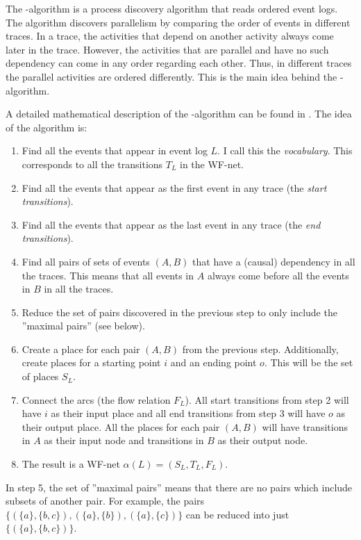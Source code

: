 The \textalpha-algorithm is a process discovery algorithm that reads ordered event logs.
The algorithm discovers parallelism by comparing the order of events in different traces.
In a trace, the activities that depend on another activity always come later in the trace.
However, the activities that are parallel and have no such dependency can come in any order regarding each other.
Thus, in different traces the parallel activities are ordered differently. 
This is the main idea behind the \textalpha-algorithm.

A detailed mathematical description of the \textalpha-algorithm can be found in \cite{van2004workflow}.
The idea of the algorithm is:

\begin{enumerate}
    \item Find all the events that appear in event log $L$. I call this the \emph{vocabulary}. This corresponds to all the transitions $T_L$ in the WF-net.
    \item Find all the events that appear as the first event in any trace (the \emph{start transitions}).
    \item Find all the events that appear as the last event in any trace (the \emph{end transitions}).
    \item Find all pairs of sets of events $(A,B)$ that have a (causal) dependency in all the traces. This means that all events in $A$ always come before all the events in $B$ in all the traces.
    \item Reduce the set of pairs discovered in the previous step to only include the ''maximal pairs'' (see below). 
    \item Create a place for each pair $(A,B)$ from the previous step. Additionally, create places for a starting point $i$ and an ending point $o$. This will be the set of places $S_L$.
    \item Connect the arcs (the flow relation $F_L$). All start transitions from step 2 will have $i$ as their input place and all end transitions from step 3 will have $o$ as their output place. All the places for each pair $(A,B)$ will have transitions in $A$ as their input node and transitions in $B$ as their output node.
    \item The result is a WF-net $\alpha(L) = ( S_L, T_L, F_L )$.
\end{enumerate}

In step 5, the set of ''maximal pairs'' means that there are no pairs which include subsets of another pair. For example, the pairs $\{(\{a\},\{b,c\}),(\{a\},\{b\}),(\{a\},\{c\})\}$ can be reduced into just $\{(\{a\},\{b,c\})\}$.

